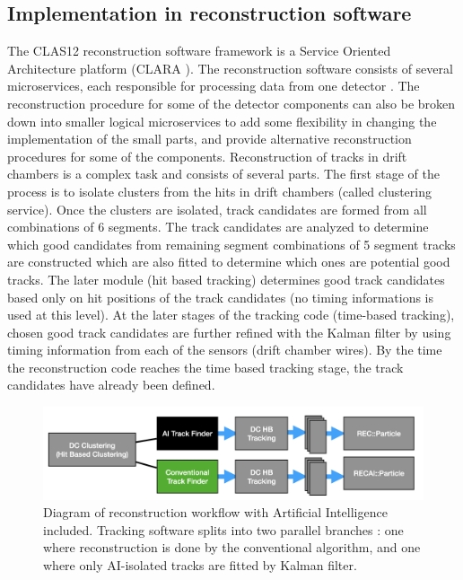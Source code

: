 \subsection{Implementation in reconstruction software}

The CLAS12 reconstruction software framework is a Service Oriented Architecture platform (CLARA \cite{Gyurjyan:2011zz}).
The reconstruction software consists of several microservices, each responsible for processing data from one
detector \cite{Ziegler:2020gsr}. The reconstruction procedure for some of the detector components can also 
be broken down into smaller logical microservices to add some flexibility in changing the implementation of the small parts, 
and provide alternative reconstruction procedures for some of the components.
Reconstruction of tracks in drift chambers is a complex task and consists of several parts.
The first stage of the process is to isolate clusters
from the hits in drift chambers (called clustering service). Once the clusters are isolated, track candidates are formed from all combinations 
of 6 segments. The track candidates are analyzed to determine which good candidates from remaining segment 
combinations of 5 segment tracks are constructed which are also fitted to determine which ones are potential good tracks.
The later module (hit based tracking) determines good track candidates based only on hit positions of the track candidates (no timing
informations is used at this level). At the later stages of the tracking code (time-based tracking), chosen good track candidates are further refined with the Kalman filter by using timing information from each of the sensors (drift chamber wires). By the time the reconstruction code reaches the time based tracking stage, the track candidates have already been defined. 

\begin{figure}[!ht]
\begin{center}
 \includegraphics[width=6.0in]{images/recon_diagram.png}
\caption {Diagram of reconstruction workflow with Artificial Intelligence included. Tracking software splits into two parallel branches : one where reconstruction is done by the conventional algorithm, and one where only AI-isolated tracks are fitted by Kalman filter.}
 \label{recon:diagram}
 \end{center}
\end{figure}

